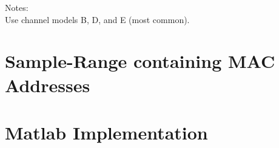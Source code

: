 Notes:\\

Use channel models B, D, and E (most common).



\section{Sample-Range containing MAC Addresses}



\section{Matlab Implementation}
